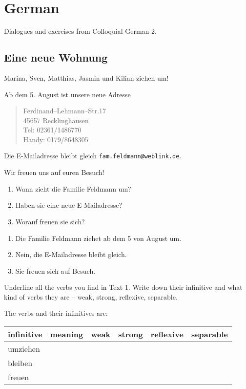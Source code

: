 \chapter{German}
Dialogues and exercises from Colloquial German 2.

\section{Eine neue Wohnung}

\begin{exercise}[Text]
Marina, Sven, Matthias, Jasmin und Kilian ziehen um!

Ab dem 5. August ist unsere neue Adresse
\begin{quote}
  Ferdinand--Lehmann--Str.\@ 17\\
  45657 Recklinghausen\\
  Tel: 02361/1486770\\
  Handy: 0179/8648305
\end{quote}
Die E-Mailadresse bleibt gleich \texttt{fam.feldmann@weblink.de}.

Wir freuen uns auf euren Besuch!
\end{exercise}

\begin{exercise}
  \hfill
  \begin{enumerate}[label=\arabic*.]
  \item Wann zieht die Familie Feldmann um?
  \item Haben sie eine neue E-Mailadresse?
  \item Worauf freuen sie sich?
  \end{enumerate}
\end{exercise}
\begin{solution}\hfill
  \begin{enumerate}[label=\arabic*.]
  \item Die Familie Feldmann ziehet ab dem 5 von August um.
  \item Nein, die E-Mailadresse bleibt gleich.
  \item Sie freuen sich auf Besuch.
  \end{enumerate}
\end{solution}

\begin{exercise}
  Underline all the verbs you find in Text 1. Write down their infinitive
  and what kind of verbs they are -- weak, strong, reflexive, separable.
\end{exercise}
\begin{solution}
  The verbs and their infinitives are:
  \begin{center}
  \begin{tabular}{|l|l|l|l|l|l|}
    \hline
    infinitive&meaning&weak&strong&reflexive&separable\\
    \hline
    umziehen\\
    bleiben\\
    freuen\\
  \end{tabular}
  \end{center}
\end{solution}

